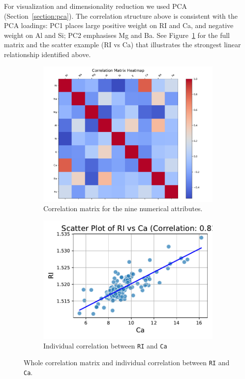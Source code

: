\documentclass[dtu]{dtuarticle}
\begin{document}
	For visualization and dimensionality reduction we used PCA (Section~\ref{section:pca}). The correlation structure above
	is consistent with the PCA loadings: PC1 places large positive weight on RI and Ca, and negative weight
	on Al and Si; PC2 emphasises Mg and Ba.  See Figure~\ref{fig:correlation} for the full matrix and the
	scatter example (RI vs Ca) that illustrates the strongest linear relationship identified above.

	\begin{figure}
		\centering
		\begin{subfigure}{.49\textwidth}
			\centering
			\includegraphics[width=\textwidth]{figures/correlation_matrix}
			\caption{Correlation matrix for the nine numerical attributes.}
			\label{fig:correlation}
		\end{subfigure}
		\begin{subfigure}{.49\textwidth}
			\centering
			\includegraphics[width=\textwidth]{figures/scatter_RI_vs_Ca}
			\caption{Individual correlation between \texttt{RI} and \texttt{Ca}}
			\label{fig:individual-correlation}
		\end{subfigure}
		\caption{Whole correlation matrix and individual correlation between \texttt{RI} and \texttt{Ca}.}
	\end{figure}
\end{document}
